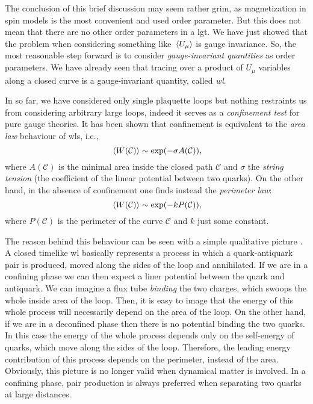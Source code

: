 The conclusion of this brief discussion may seem rather grim, as magnetization in spin models is the most convenient and used order parameter.
But this does not mean that there are no other order parameters in a \ac{lgt}.
We have just showed that the problem when considering something like $\ev*{U_{\mu}}$ is gauge invariance.
So, the most reasonable step forward is to consider \emph{gauge-invariant quantities} as order parameters.
We have already seen that tracing over a product of $U_{\mu}$ variables along a closed curve is a gauge-invariant quantity, called \emph{\ac{wl}}.

In so far, we have considered only single plaquette loops but nothing restraints us from considering arbitrary large loops, indeed it serves as a \emph{confinement test} for pure gauge theories.
It has been shown \cite{wilson1974confinement} that confinement is equivalent to the \emph{area law} behaviour of \ac{wl}s, i.e.,
\begin{equation}
    \ev*{W(\mathcal{C})} \sim \exp(- \sigma A(\mathcal{C})),
    \label{eq:wilson_area_law}
\end{equation}
where $A(\mathcal{C})$ is the minimal area inside the closed path $\mathcal{C}$ and $\sigma$ the \emph{string tension} (the coefficient of the linear potential between two quarks).
On the other hand, in the absence of confinement one finds instead the \emph{perimeter law}:
\begin{equation}
    \ev*{W(\mathcal{C})} \sim \exp(- k P(\mathcal{C})),
    \label{eq:wilson_perimeter_law}
\end{equation}
where $P(\mathcal{C})$ is the perimeter of the curve $\mathcal{C}$ and $k$ just some constant.

The reason behind this behaviour can be seen with a simple qualitative picture \cite{creutz1985book, wilson1974confinement}.
A closed timelike \ac{wl} basically represents a process in which a quark-antiquark pair is produced, moved along the sides of the loop and annihilated.
If we are in a confining phase we can then expect a liner potential between the quark and antiquark.
We can imagine a flux tube \emph{binding} the two charges, which swoops the whole inside area of the loop.
Then, it is easy to image that the energy of this whole process will necessarily depend on the area of the loop.
On the other hand, if we are in a deconfined phase then there is no potential binding the two quarks.
In this case the energy of the whole process depends only on the self-energy of quarks, which move along the sides of the loop.
Therefore, the leading energy contribution of this process depends on the perimeter, instead of the area.
Obviously, this picture is no longer valid when dynamical matter is involved.
In a confining phase, pair production is always preferred when separating two quarks at large distances.

